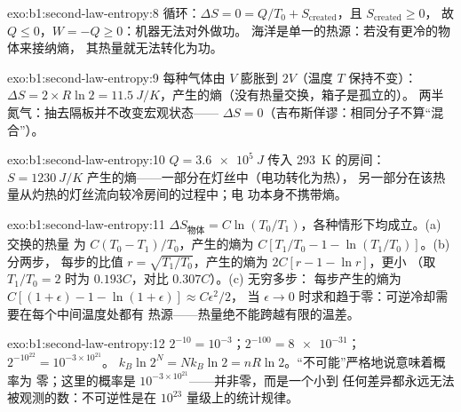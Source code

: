 \begin{solution}{exo:b1:second-law-entropy:8}
循环：$\Delta S = 0 = Q/T_0 + S_{\mathrm{created}}$，且 $S_{\mathrm{created}} \geq 0$，
故 $Q \leq 0$，$W = -Q \geq 0$：机器无法对外做功。
海洋是单一的热源：若没有更冷的物体来接纳熵，
其热量就无法转化为功。
\end{solution}

\begin{solution}{exo:b1:second-law-entropy:9}
每种气体由 $V$ 膨胀到 $2V$（温度 $T$ 保持不变）：$\Delta S = 2 \times R\ln2
= \qty{11.5}{J/K}$，产生的熵（没有热量交换，箱子是孤立的）。
两半氮气：抽去隔板并不改变宏观状态——
$\Delta S = 0$（吉布斯佯谬：相同分子不算“混合”）。
\end{solution}

\begin{solution}{exo:b1:second-law-entropy:10}
$Q = \qty{3.6e5}{J}$ 传入 \qty{293}{K} 的房间：$S = \qty{1230}{J/K}$
产生的熵——一部分在灯丝中（电功转化为热），
另一部分在该热量从灼热的灯丝流向较冷房间的过程中；电
功本身不携带熵。
\end{solution}

\begin{solution}{exo:b1:second-law-entropy:11}
$\Delta S_{\text{物体}} = C\ln(T_0/T_1)$，各种情形下均成立。(a) 交换的热量
为 $C(T_0 - T_1)/T_0$，产生的熵为 $C[T_1/T_0 - 1 - \ln(T_1/T_0)]$。(b) 分两步，
每步的比值 $r = \sqrt{T_1/T_0}$，产生的熵为 $2C[r - 1 - \ln r]$，更小
（取 $T_1/T_0 = 2$ 时为 $0.193C$，对比 $0.307C$）。(c) 无穷多步：
每步产生的熵为 $C[(1 + \epsilon) - 1 - \ln(1 + \epsilon)] \approx C\epsilon^2/2$，
当 $\epsilon \to 0$ 时求和趋于零：可逆冷却需要在每个中间温度处都有
热源——热量绝不能跨越有限的温差。
\end{solution}

\begin{solution}{exo:b1:second-law-entropy:12}
$2^{-10} = 10^{-3}$；$2^{-100} = \num{8e-31}$；$2^{-10^{22}} = 10^{-3\times10^{21}}$。
$k_B\ln2^N = Nk_B\ln2 = nR\ln2$。“不可能”严格地说意味着概率为
零；这里的概率是 $10^{-3\times10^{21}}$——并非零，而是一个小到
任何差异都永远无法被观测的数：不可逆性是在
$10^{23}$ 量级上的统计规律。
\end{solution}

